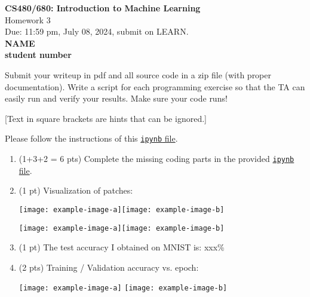 \documentclass[10pt]{article}
\newcommand{\red}[1]{{\color{red}#1}}
\newcommand{\green}[1]{{\color{green}#1}}
\begin{document}
	
	\begin{center}
		\large{\textbf{CS480/680: Introduction to Machine Learning} \\ Homework 3\\ \red{Due: 11:59 pm, July 08, 2024}, \red{submit on LEARN}.} \\
		
		{\bf \green{NAME}} \\
		{\bf \green{student number}}
		
	\end{center}
	
	\begin{center}
		Submit your writeup in pdf and all source code in a zip file (with proper documentation). Write a script for each programming exercise so that the TA can easily run and verify your results. Make sure your code runs!
		
		[Text in square brackets are hints that can be ignored.]
	\end{center}

	\begin{exercise}
		Please follow the instructions of this \href{https://cs.uwaterloo.ca/~y328yu/mycourses/480/a3-vit.ipynb}{\texttt{ipynb} file}. 

		\begin{enumerate}
		\item (1+3+2 = 6 pts) Complete the missing coding parts in the provided \href{https://cs.uwaterloo.ca/~y328yu/mycourses/480/a3-vit.ipynb}{\texttt{ipynb} file}.

		\item (1 pt) Visualization of patches: 

		\texttt{[image: example-image-a]}\texttt{[image: example-image-b]}
		
		\texttt{[image: example-image-a]}\texttt{[image: example-image-b]}
		
		\item (1 pt) The test accuracy I obtained on MNIST is: xxx\%

		\item (2 pts) Training / Validation accuracy  vs. epoch:

		\texttt{[image: example-image-a]}
		\texttt{[image: example-image-b]}
		\end{enumerate}
	\end{exercise}
\end{document}
